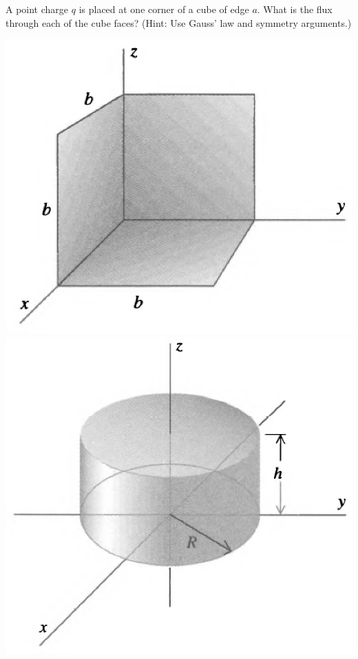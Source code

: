 \documentclass[11pt,letterpaper,boxed]{hmcpset}
\begin{document}
	\begin{problem}[HRK E27.11]
		A point charge $q$ is placed at one corner of a cube of edge $a$. What is the flux through each of the cube faces? (Hint: Use Gauss' law and symmetry arguments.)
		
		\begin{center}
			\includegraphics[scale=0.2]{II-10a.png}
			\includegraphics[scale=0.2]{II-10b.png}

\end{center}
\end{problem}
\end{document}
